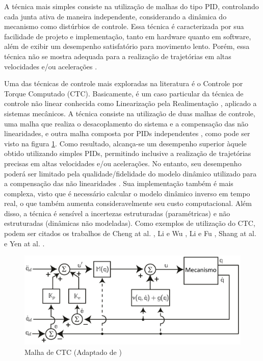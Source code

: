 \documentclass[]{politex}
\begin{document}
A técnica mais simples consiste na utilização de malhas do tipo PID, controlando cada junta ativa de maneira independente, considerando a dinâmica do mecanismo como distúrbios de controle. Essa técnica é caracterizada por sua facilidade de projeto e implementação, tanto em hardware quanto em software, além de exibir um desempenho satisfatório para movimento lento. Porém, essa técnica não se mostra adequada para a realização de trajetórias em altas velocidades e/ou acelerações \cite{Honegger, Zubizarreta}.

Uma das técnicas de controle mais exploradas na literatura é o Controle por Torque Computado (CTC). Basicamente, é um caso particular da técnica de controle não linear conhecida como Linearização pela Realimentação \cite{Slotini}, aplicado a sistemas mecânicos. A técnica consiste na utilização de duas malhas de controle, uma malha que realiza o desacoplamento do sistema e a compensação das não linearidades, e outra malha composta por PIDs independentes \cite{Craig}, como pode ser visto na figura \ref{fig:CTC}. Como resultado, alcança-se um desempenho  superior  àquele obtido utilizando simples PIDs, permitindo inclusive a realização de trajetórias precisas em altas velocidades e/ou acelerações. No entanto, seu desempenho poderá ser limitado pela qualidade/fidelidade do modelo dinâmico utilizado para a compensação das não linearidades \cite{SlotiniSMC}. Sua implementação também é mais complexa, visto que é necessário calcular o modelo dinâmico inverso em tempo real, o que também aumenta consideravelmente seu custo computacional. Além disso, a técnica é sensível a incertezas estruturadas (paramétricas) e não estruturadas (dinâmicas não modeladas). Como exemplos de utilização do CTC, podem ser citados os trabalhos de Cheng at al. \cite{Cheng}, Li e Wu \cite{Li}, Li e Fu \cite{Li2}, Shang at al. \cite{Shang} e Yen at al. \cite{Yen}.

\begin{figure}[h]
	\centering
	\includegraphics[scale=0.385]{../figures/CTC.jpg}  
	\caption{Malha de CTC (Adaptado de \cite{Craig})}
	\label{fig:CTC}
\end{figure}
\end{document}
